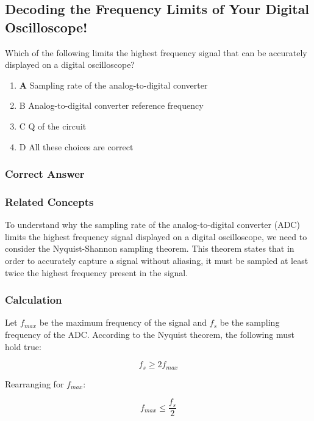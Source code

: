 \subsection{Decoding the Frequency Limits of Your Digital Oscilloscope!}

\begin{tcolorbox}[colback=gray!10, colframe=black, title=E4A01]
Which of the following limits the highest frequency signal that can be accurately displayed on a digital oscilloscope?
\begin{enumerate}[label=\Alph*.]
    \item \textbf{A} Sampling rate of the analog-to-digital converter
    \item B Analog-to-digital converter reference frequency
    \item C Q of the circuit
    \item D All these choices are correct
\end{enumerate} \end{tcolorbox}

\subsubsection{Correct Answer}


\subsubsection{Related Concepts}
To understand why the sampling rate of the analog-to-digital converter (ADC) limits the highest frequency signal displayed on a digital oscilloscope, we need to consider the Nyquist-Shannon sampling theorem. This theorem states that in order to accurately capture a signal without aliasing, it must be sampled at least twice the highest frequency present in the signal.

\subsubsection{Calculation}
Let \( f_{max} \) be the maximum frequency of the signal and \( f_s \) be the sampling frequency of the ADC. According to the Nyquist theorem, the following must hold true:

\begin{equation}
f_s \geq 2f_{max}
\end{equation}

Rearranging for \( f_{max} \):

\begin{equation}
f_{max} \leq \frac{f_s}{2}
\end{equation}


